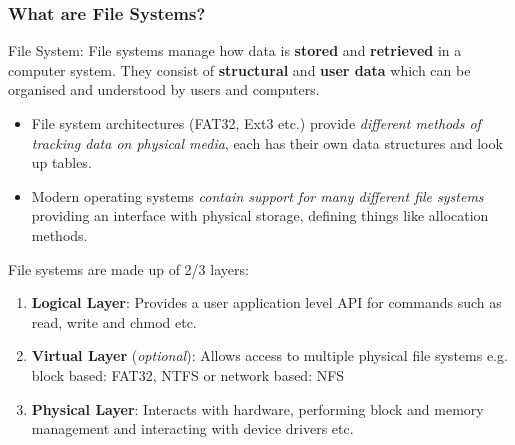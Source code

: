 \documentclass{beamer}
\begin{document}
\begin{frame}[allowframebreaks]
	\frametitle{What are File Systems?}
	\begin{block}{File System:}
		File systems manage how data is \textbf{stored} and \textbf{retrieved} in a computer system. They consist of \textbf{structural} and \textbf{user data} which can be organised and understood by users and computers.
	\end{block}
	
	\begin{itemize}
		\item File system architectures (FAT32, Ext3 etc.) provide \textit{different methods of tracking data on physical media}, each has their own data structures and look up tables. %
		\\
		
		\item Modern operating systems \textit{contain support for many different file systems} providing an interface with physical storage, defining things like allocation methods. 
	\end{itemize}
	
	\newpage
	File systems are made up of 2/3 layers:
	\begin{enumerate}
		\item\textbf{Logical Layer}: Provides a user application level API for commands such as read, write and chmod etc.
		\item\textbf{Virtual Layer} (\textit{optional}): Allows access to multiple physical file systems e.g. block based: FAT32, NTFS or network based: NFS
		\item\textbf{Physical Layer}: Interacts with hardware, performing block and memory management and interacting with device drivers etc.
	\end{enumerate}
\end{frame}
\end{document}

